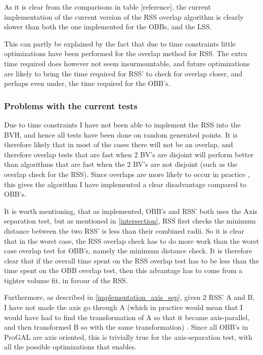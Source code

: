 As it is clear from the comparisons in table [reference], the current implementation of the current version of the RSS overlap algorithm is clearly slower than both the one implemented for the OBBs, and the LSS. 

This can partly be explained by the fact that due to time constraints little optimizations have been performed for the overlap method for RSS. The extra time required does however not seem insurmountable, and future optimizations are likely to bring the time required for RSS' to check for overlap closer, and perhaps even under, the time required for the OBB's.

\subsubsection{Problems with the current tests}
\label{test_problems}
Due to time constraints I have not been able to implement the RSS into the BVH, and hence all tests have been done on random generated points. It is therefore likely that in most of the cases there will not be an overlap, and therefore overlap tests that are fast when 2 BV's are disjoint will perform better than algorithms that are fast when the 2 BV's are not disjoint (such as the overlap check for the RSS). Since overlaps are more likely to occur in practice , this gives the algorithm I have implemented a clear disadvantage compared to OBB's.

It is worth mentioning, that as implemented, OBB's and RSS' both uses the Axis separation test, but as mentioned in \ref{intersection}, RSS first checks the minimum distance between the two RSS' is less than their combined radii. So it is clear that in the worst case, the RSS overlap check has to do more work than the worst case overlap test for OBB's, namely the minimum distance check. It is therefore clear that if the overall time spent on the RSS overlap test has to be less than the time spent on the OBB overlap test, then this advantage has to come from a tighter volume fit, in favour of the RSS. 

Furthermore, as described in \ref{implementation_axis_sep}, given 2 RSS' A and B, I have not made the axis go through A (which in practice would mean that I would have had to find the transformation of A so that it became axis-parallel, and then transformed B so with the same transformation) . Since all OBB's in ProGAL are axis oriented, this is trivially true for the axis-separation test, with all the possible optimizations that enables.
